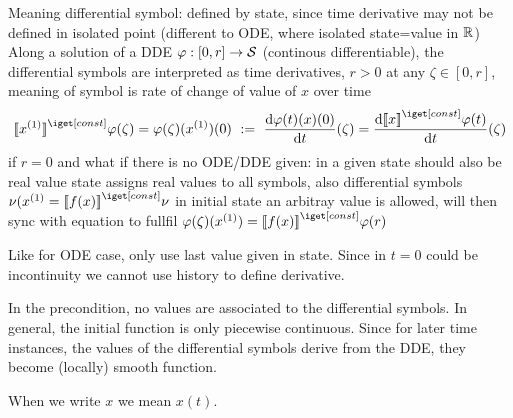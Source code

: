 \begin{definition}
        Meaning differential symbol: defined by state, since time derivative may not be defined in isolated point (different to ODE, where isolated state=value in $\mathbb{R}$)
        Along a solution of a DDE $\varphi:[0,r]\rightarrow\mathcal{S}$ (continous differentiable), the differential symbols are interpreted as time derivatives, $r>0$ at any $\zeta\in[0,r]$, meaning of symbol is rate of change of value of $x$ over time
        \begin{equation}
            \imodel{}{\D{x}}\varphi(\zeta)=\varphi(\zeta)(\D{x})(0)\defeq\DD{\varphi(t)(x)(0)}{t}(\zeta) = \DD{\imodel{}{x}\varphi(t)}{t}(\zeta)
        \end{equation}
        if $r=0$
        and what if there is no ODE/DDE given: in a given state should also be real value
        state assigns real values to all symbols, also differential symbols $\nu(\D{x}=\imodel{}{f(x)}\nu$
        in initial state an arbitray value is allowed, will then sync with equation to fullfil $\varphi(\zeta)(\D{x})=\imodel{}{f(x)}\varphi(r)$

        Like for ODE case, only use last value given in state. Since in $t=0$ could be incontinuity we cannot use history to define derivative.

        \begin{lemma}

        \end{lemma}

        In the precondition, no values are associated to the differential symbols. In general, the initial function is only piecewise continuous.
        Since for later time instances, the values of the differential symbols derive from the DDE, they become (locally) smooth function.

    \end{definition}

    When we write $x$ we mean $x(t)$.

